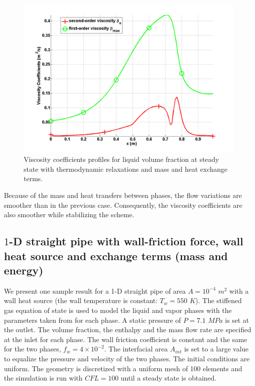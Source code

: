 %
\begin{figure}[H]
\centering
\includegraphics[width=\textwidth]{figures/SEM/Aint1e3MassOn_liquid_beta.png}
\caption{Viscosity coefficients profiles for liquid volume fraction at steady state with thermodynamic relaxations and mass and heat exchange terms.}
\label{fig:two-fluids-rel-nozzle-visc-vf-mass-on-sem-sect4}
\end{figure}
%
Because of the mass and heat transfers between phases, the flow variations are smoother than in the previous case. Consequently, the viscosity coefficients are also smoother while stabilizing the scheme.  
\subsection{$1$-D straight pipe with wall-friction force, wall heat source and exchange terms (mass and energy)}\label{sec:1d-straight-pipe-7-eq-sct4}
We present one sample result for a 1-D straight pipe of area $A = 10^{-4}$ $m^2$ with a wall heat source (the wall temperature is constant: $T_w = 550$ $K$). The stiffened gas equation of state is used to model the liquid and vapor phases with the parameters taken from \cite{SGEOS} for each phase. A static pressure of $P=7.1$ $MPa$ is set at the outlet. The volume fraction, the enthalpy and the mass flow rate are specified at the inlet for each phase. The wall friction coefficient is constant and the same for the two phases, $f_w = 4 \times 10^{-2}$. The interfacial area $A_{int}$ is set to a large value to equalize the pressure and velocity of the two phases. The initial conditions are uniform. The geometry is discretized with a uniform mesh of 100 elements and the simulation is run with $CFL=100$  until a steady state is obtained. 

